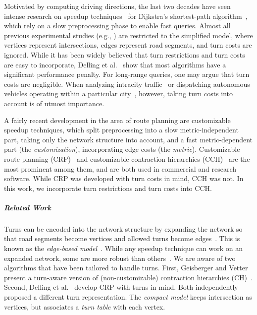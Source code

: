 \documentclass[a4paper, english, cleveref]{lipics-v2021}
\begin{document}
Motivated by computing driving directions, the last two decades have seen intense research on speedup techniques~\cite{BastDGMPSWW16} for Dijkstra's shortest-path algorithm~\cite{Dijkstra59}, which rely on a slow preprocessing phase to enable fast queries. Almost all previous experimental studies (e.g., \cite{GoldbergH05, HilgerKMS09, Lauther09, DibbeltSW16, Gutman04, AbrahamDGW11, ArzLS13, BastFSS07}) are restricted to the simplified model, where vertices represent intersections, edges represent road segments, and turn costs are ignored. While it has been widely believed that turn restrictions and turn costs are easy to incorporate, Delling et al.~\cite{DellingGPW17} show that most algorithms have a significant performance penalty. For long-range queries, one may argue that turn costs are negligible. When analyzing intracity traffic~\cite{BuchholdSW19, SchneckN20} or dispatching autonomous vehicles operating within a particular city~\cite{BischoffM16, BischoffMN17}, however, taking turn costs into account is of utmost importance.

A fairly recent development in the area of route planning are customizable speedup techniques, which split preprocessing into a slow metric-independent part, taking only the network structure into account, and a fast metric-dependent part (the \emph{customization}), incorporating edge costs (the \emph{metric}). Customizable route planning (CRP)~\cite{DellingGPW17} and customizable contraction hierarchies (CCH)~\cite{DibbeltSW16} are the most prominent among them, and are both used in commercial and research software. While CRP was developed with turn costs in mind, CCH was not. In this work, we incorporate turn restrictions and turn costs into CCH.

\subparagraph*{Related Work}

Turns can be encoded into the network structure by expanding the network so that road segments become vertices and allowed turns become edges~\cite{Caldwell61, Winter02}. This is known as the \emph{edge-based model}~\cite{BastDGMPSWW16}. While any speedup technique can work on an expanded network, some are more robust than others~\cite{DellingGPW17}. We are aware of two algorithms that have been tailored to handle turns. First, Geisberger and Vetter~\cite{GeisbergerV11} present a turn-aware version of (non-customizable) contraction hierarchies (CH)~\cite{GeisbergerSSV12}. Second, Delling et al.~\cite{DellingGPW11} develop CRP with turns in mind. Both independently proposed a different turn representation. The \emph{compact model} keeps intersection as vertices, but associates a \emph{turn table} with each vertex.
\end{document}
